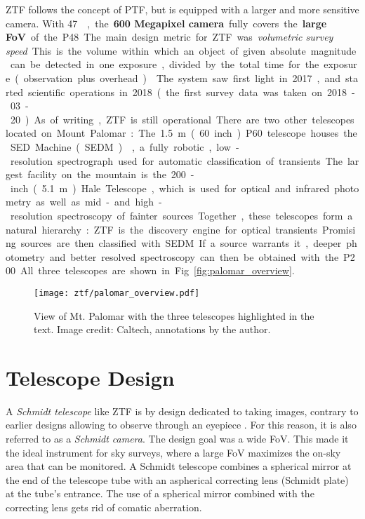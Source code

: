 ZTF follows the concept of PTF, but is equipped with a larger and more sensitive camera. With \SI{47}{\square\deg}, the \textbf{600 Megapixel camera} fully covers the \textbf{large FoV} of the P48. The main design metric for ZTF was \textit{volumetric survey speed}. This is the volume within which an object of given absolute magnitude can be detected in one exposure, divided by the total time for the exposure (observation plus overhead) . The system saw first light in 2017, and started scientific operations in 2018 (the first survey data was taken on 2018-03-20). As of writing, ZTF is still operational.

There are two other telescopes located on Mount Palomar: The \SI{1.5}{\meter} (60 inch) P60 telescope houses the SED Machine (SEDM) , a fully robotic, low-resolution spectrograph used for automatic classification of transients. The largest facility on the mountain is the 200-inch (\SI{5.1}{\meter}) Hale Telescope, which is used for optical and infrared photometry as well as mid- and high-resolution spectroscopy of fainter sources. Together, these telescopes form a natural hierarchy: ZTF is the discovery engine for optical transients. Promising sources are then classified with SEDM. If a source warrants it, deeper photometry and better resolved spectroscopy can then be obtained with the P200. All three telescopes are shown in Fig. \ref{fig:palomar_overview}.

\begin{figure*}[]
    \texttt{[image: ztf/palomar\_overview.pdf]}
    \caption[View of Mt. Palomar]{View of Mt. Palomar with the three telescopes highlighted in the text. Image credit: Caltech, annotations by the author.}
\end{figure*}

\section{Telescope Design} \label{telescope_design}
A \textit{Schmidt telescope} like ZTF is by design dedicated to taking images, contrary to earlier designs allowing to observe through an eyepiece . For this reason, it is also referred to as a \textit{Schmidt camera}. The design goal was a wide FoV. This made it the ideal instrument for sky surveys, where a large FoV maximizes the on-sky area that can be monitored. A Schmidt telescope combines a spherical mirror at the end of the telescope tube with an aspherical correcting lens (Schmidt plate) at the tube's entrance. The use of a spherical mirror combined with the correcting lens gets rid of comatic aberration.

